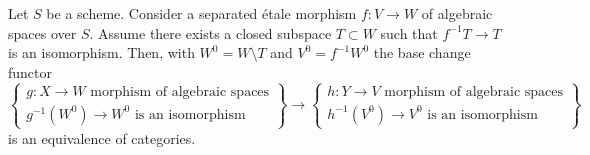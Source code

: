 \begin{lemma}
\label{lemma-excision-modifications}
Let $S$ be a scheme. Consider a separated \'etale morphism
$f : V \to W$ of algebraic spaces over $S$.
Assume there exists a
closed subspace $T \subset W$ such that $f^{-1}T \to T$ is
an isomorphism. Then, with $W^0 = W \setminus T$ and
$V^0 = f^{-1}W^0$ the base change functor
$$
\left\{
\begin{matrix}
g : X \to W\text{ morphism of algebraic spaces} \\
g^{-1}(W^0) \to W^0\text{ is an isomorphism}
\end{matrix}
\right\}
\longrightarrow
\left\{
\begin{matrix}
h : Y \to V\text{ morphism of algebraic spaces} \\
h^{-1}(V^0) \to V^0\text{ is an isomorphism}
\end{matrix}
\right\}
$$
is an equivalence of categories.
\end{lemma}

